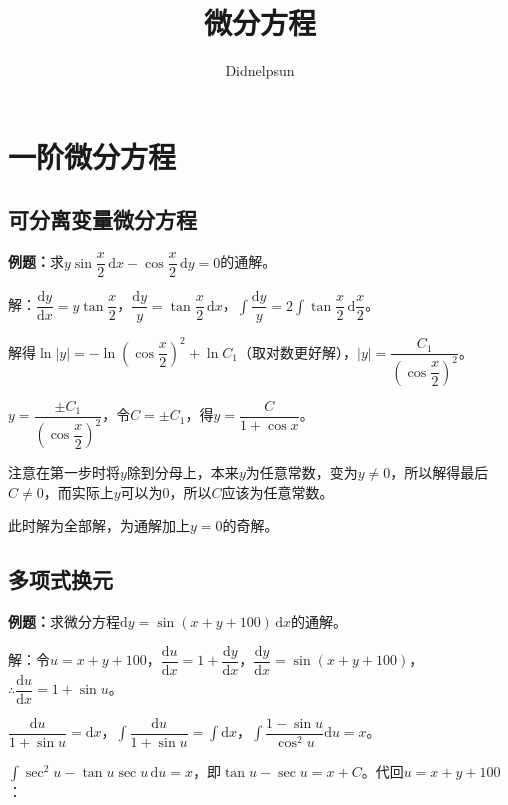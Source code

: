 \documentclass[UTF8, 12pt]{ctexart}
\author{Didnelpsun}
\title{微分方程}
\date{}
\begin{document}
\maketitle
\pagestyle{empty}
\thispagestyle{empty}
\tableofcontents
\thispagestyle{empty}
\newpage
\pagestyle{plain}
\setcounter{page}{1}

\section{一阶微分方程}

\subsection{可分离变量微分方程}

\textbf{例题：}求$y\sin\dfrac{x}{2}\,\textrm{d}x-\cos\dfrac{x}{2}\,\textrm{d}y=0$的通解。

解：$\dfrac{\textrm{d}y}{\textrm{d}x}=y\tan\dfrac{x}{2}$，$\dfrac{\textrm{d}y}{y}=\tan\dfrac{x}{2}\,\textrm{d}x$，$\displaystyle{\int\dfrac{\textrm{d}y}{y}=2\int\tan\dfrac{x}{2}\,\textrm{d}\dfrac{x}{2}}$。

解得$\ln\vert y\vert=-\ln\left(\cos\dfrac{x}{2}\right)^2+\ln C_1$（取对数更好解），$\vert y\vert=\dfrac{C_1}{\left(\cos\dfrac{x}{2}\right)^2}$。

$y=\dfrac{\pm C_1}{\left(\cos\dfrac{x}{2}\right)^2}$，令$C=\pm C_1$，得$y=\dfrac{C}{1+\cos x}$。

注意在第一步时将$y$除到分母上，本来$y$为任意常数，变为$y\neq0$，所以解得最后$C\neq0$，而实际上$y$可以为0，所以$C$应该为任意常数。

此时解为全部解，为通解加上$y=0$的奇解。

\subsection{多项式换元}

\textbf{例题：}求微分方程$\textrm{d}y=\sin(x+y+100)\,\textrm{d}x$的通解。

解：令$u=x+y+100$，$\dfrac{\textrm{d}u}{\textrm{d}x}=1+\dfrac{\textrm{d}y}{\textrm{d}x}$，$\dfrac{\textrm{d}y}{\textrm{d}x}=\sin(x+y+100)$，$\therefore\dfrac{\textrm{d}u}{\textrm{d}x}=1+\sin u$。

$\dfrac{\textrm{d}u}{1+\sin u}=\textrm{d}x$，$\displaystyle{\int\dfrac{\textrm{d}u}{1+\sin u}}=\int\textrm{d}x$，$\displaystyle{\int\dfrac{1-\sin u}{\cos^2u}}\textrm{d}u=x$。

$\int\sec^2u-\tan u\sec u\,\textrm{d}u=x$，即$\tan u-\sec u=x+C$。代回$u=x+y+100$：
\end{document}
